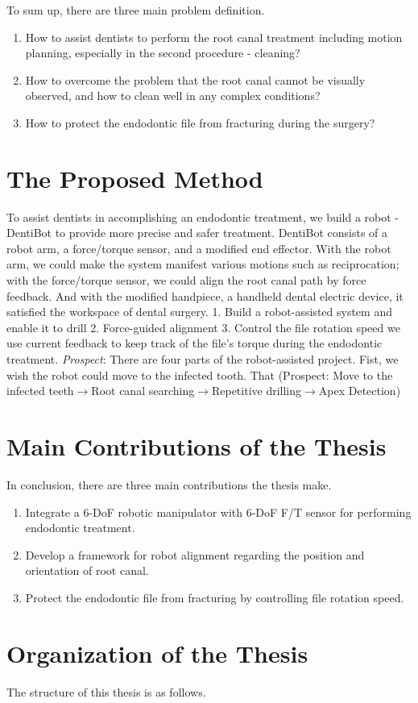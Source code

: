 \par
To sum up, there are three main problem definition.
\begin{enumerate}
\item How to assist dentists to perform the root canal treatment including motion planning, especially in the second procedure - cleaning?
\item How to overcome the problem that the root canal cannot be visually observed, and how to clean well in any complex conditions?
\item How to protect the endodontic file from fracturing during the surgery?
\end{enumerate}	
\section{The Proposed Method}
\hspace*{6mm}To assist dentists in accomplishing an endodontic treatment, we build a robot - DentiBot to provide more precise and safer treatment. DentiBot consists of a robot arm, a force/torque sensor, and a modified end effector. With the robot arm, we could make the system manifest various motions such as reciprocation; with the force/torque sensor, we could align the root canal path by force feedback. And with the modified handpiece, a handheld dental electric device, it satisfied the workspace of dental surgery.
1.	Build a robot-assisted system and enable it to drill
2.	Force-guided alignment 
3.	Control the file rotation speed
we use current feedback to keep track of the file's torque during the endodontic treatment.
\textit{Prospect}: There are four parts of the robot-assisted project. Fist, we wish the robot could move to the infected tooth. That 
(Prospect: Move to the infected teeth$\longrightarrow $Root canal searching$\longrightarrow $Repetitive drilling$\longrightarrow $Apex Detection)						
\section{Main Contributions of the Thesis}
In conclusion, there are three main contributions the thesis make.
\begin{enumerate}
	\item	Integrate a 6-DoF robotic manipulator with 6-DoF F/T sensor for performing endodontic treatment.
	\item	Develop a framework for robot alignment regarding the position and orientation of root canal. 
	\item	Protect the endodontic file from fracturing by controlling file rotation speed.
\end{enumerate}
\section{Organization of the Thesis}
\hspace*{6mm}The structure of this thesis is as follows.
